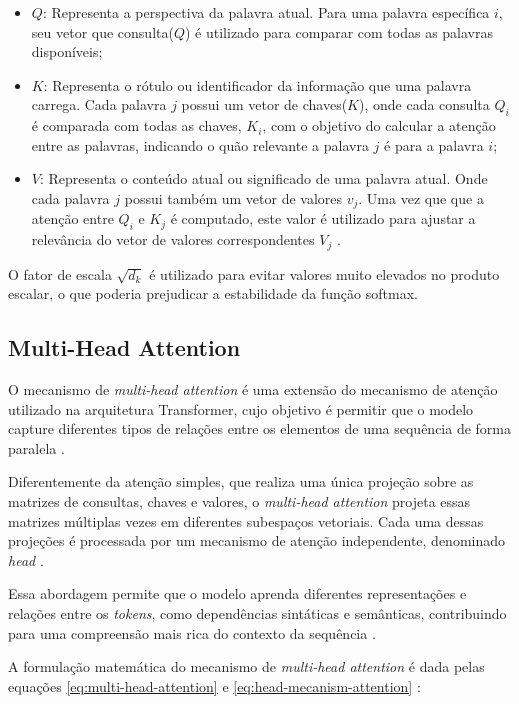 \begin{itemize}
    \item \( Q \): Representa a perspectiva da palavra atual. Para uma palavra específica \( i \), seu vetor que consulta(\( Q \)) é utilizado para comparar com todas as palavras disponíveis;
    \item \( K \): Representa o rótulo ou identificador da informação que uma palavra carrega. Cada palavra \( j \) possui um vetor de chaves(\( K \)), onde cada consulta \( Q_i \) é comparada com todas as chaves, \( K_i \), com o objetivo do calcular a atenção entre as palavras, indicando o quão relevante a palavra \( j \) é para a palavra \( i \);
    \item \( V \): Representa o conteúdo atual ou significado de uma palavra atual. Onde cada palavra \( j \) possui também um vetor de valores \( v_j \). Uma vez que que a atenção entre \( Q_i \) e \( K_j \) é computado, este valor é utilizado para ajustar a relevância do vetor de valores correspondentes \( V_j \) \cite{ibm_attention_mechanism}.
\end{itemize}

O fator de escala \(\sqrt{d_k}\) é utilizado para evitar valores muito elevados
no produto escalar, o que poderia prejudicar a estabilidade da função softmax.

\subsection{Multi-Head Attention}
O mecanismo de \textit{multi-head attention} é uma extensão do mecanismo de
atenção utilizado na arquitetura Transformer, cujo objetivo é permitir que o
modelo capture diferentes tipos de relações entre os elementos de uma sequência
de forma paralela \cite{liu2021multi}.

Diferentemente da atenção simples, que realiza uma única projeção sobre as
matrizes de consultas, chaves e valores, o \textit{multi-head attention}
projeta essas matrizes múltiplas vezes em diferentes subespaços vetoriais. Cada
uma dessas projeções é processada por um mecanismo de atenção independente,
denominado \textit{head} \cite{liu2021multi}.

Essa abordagem permite que o modelo aprenda diferentes representações e
relações entre os \textit{tokens}, como dependências sintáticas e semânticas,
contribuindo para uma compreensão mais rica do contexto da sequência
\cite{liu2021multi}.

A formulação matemática do mecanismo de \textit{multi-head attention} é dada
pelas equações \ref{eq:multi-head-attention} e  \ref{eq:head-mecanism-attention} \cite{DBLP:journals/corr/VaswaniSPUJGKP17}:

